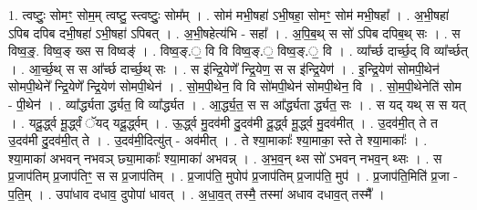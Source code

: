 \documentclass[17pt]{extarticle}
\begin{document}
1. त्वष्टुः॒ सोमꣳ॒॒ सोम॒म् त्वष्टु॒ स्त्वष्टुः॒ सोम᳚म् । . सोम॑ मभी॒षहा॑ ऽभी॒षहा॒ सोमꣳ॒॒ सोम॑ मभी॒षहा᳚ । . अ॒भी॒षहा॑ ऽपिब दपिब दभी॒षहा॑ ऽभी॒षहा॑ ऽपिबत् । . अ॒भी॒षहेत्य॑भि - सहा᳚ । . अ॒पि॒ब॒थ् स सो॑ ऽपिब दपिब॒थ् सः । . स विष्व॒ङ्॒. विष्व॒ङ् ख्स स विष्वङ्॑ । . विष्व॒ङ्.॒ वि वि विष्व॒ङ्.॒ विष्व॒ङ्.॒ वि । . व्या᳚र्च्छ दार्च्छ॒द् वि व्या᳚र्च्छत् । . आ॒र्च्छ॒थ् स स आ᳚र्च्छ दार्च्छ॒थ् सः । . स इ॑न्द्रि॒येणे᳚ न्द्रि॒येण॒ स स इ॑न्द्रि॒येण॑ । . इ॒न्द्रि॒येण॑ सोमपी॒थेन॑ सोमपी॒थेने᳚ न्द्रि॒येणे᳚ न्द्रि॒येण॑ सोमपी॒थेन॑ । . सो॒म॒पी॒थेन॒ वि वि सो॑मपी॒थेन॑ सोमपी॒थेन॒ वि । . सो॒म॒पी॒थेनेति॑ सोम - पी॒थेन॑ । . व्या᳚र्द्ध्यता र्द्ध्यत॒ वि व्या᳚र्द्ध्यत । . आ॒र्द्ध्य॒त॒ स स आ᳚र्द्ध्यता र्द्ध्यत॒ सः । . स यद् यथ् स स यत् । . यदू॒र्द्ध्व मू॒र्द्ध्वं ॅयद् यदू॒र्द्ध्वम् । . ऊ॒र्द्ध्व मु॒दव॑मी दु॒दव॑मी दू॒र्द्ध्व मू॒र्द्ध्व मु॒दव॑मीत् । . उ॒दव॑मी॒त् ते त उ॒दव॑मी दु॒दव॑मी॒त् ते । . उ॒दव॑मी॒दित्यु॑त् - अव॑मीत् । . ते श्या॒माकाः᳚ श्या॒माका॒ स्ते ते श्या॒माकाः᳚ । . श्या॒माका॑ अभवन् नभवञ् छ्या॒माकाः᳚ श्या॒माका॑ अभवन्न् । . अ॒भ॒व॒न् थ्स सो॑ ऽभवन् नभव॒न् थ्सः । . स प्र॒जाप॑तिम् प्र॒जाप॑तिꣳ॒॒ स स प्र॒जाप॑तिम् । . प्र॒जाप॑ति॒ मुपोप॑ प्र॒जाप॑तिम् प्र॒जाप॑ति॒ मुप॑ । . प्र॒जाप॑ति॒मिति॑ प्र॒जा - प॒ति॒म् । . उपा॑धाव दधाव॒ दुपोपा॑ धावत् । . अ॒धा॒व॒त् तस्मै॒ तस्मा॑ अधाव दधाव॒त् तस्मै᳚ । \newline
\end{document}
